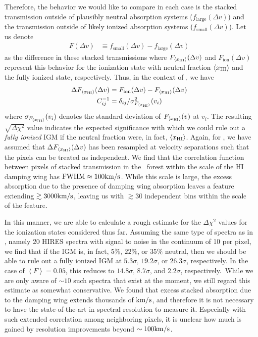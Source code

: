 Therefore, the behavior we would like to compare in each case is the stacked transmission outside of plausibly neutral absorption systems ($f_{\text{large}}(\Delta v)$) and the transmission outside of likely ionized absorption systems ($f_{\text{small}}(\Delta v)$). Let us denote 
\begin{align}
F(\Delta v) &\equiv f_{\text{small}}(\Delta v) - f_{\text{large}}(\Delta v)
 \end{align}
as the difference in these stacked transmissions where $F_{\langle x_{\text{HI}}\rangle}(\Delta v)$ and $F_{\text{ion}}(\Delta v)$ represent this behavior for the ionization state with neutral fraction $\langle x_{\text{HI}}\rangle$ and the fully ionized state, respectively. Thus, in the context of , we have
\begin{align}
\Delta F_{\langle x_{\text{HI}}\rangle}(\Delta v) &= F_{\text{ion}}(\Delta v) - F_{\langle x_{\text{HI}}\rangle}(\Delta v) \\
C^{-1}_{ij} &= \delta_{ij}/\sigma^2_{F_{\langle x_{\text{HI}}\rangle}}(v_i) \label{eq:ChiSquare_HI}
\end{align}
 where $\sigma_{F_{\langle x_{\text{HI}}\rangle}}(v_i)$ denotes the standard deviation of $F_{\langle x_{\text{HI}}\rangle}(v)$ at $v_i$. The resulting $\sqrt{\Delta \chi^2}$ value indicates the expected significance with which we could rule out a \textit{fully ionized} IGM if the neutral fraction were, in fact, $\langle x_{\text{HI}}\rangle$. Again, for , we have assumed that $\Delta F_{\langle x_{\text{HI}}\rangle}(\Delta v)$ has been resampled at velocity separations such that the pixels can be treated as independent. We find that the correlation function between pixels of stacked transmission in the \lya\ forest within the scale of the HI damping wing has $\text{FWHM}\approx 100\text{km}/\text{s}$. While this scale is large, the excess absorption due to the presence of damping wing absorption leaves a feature extending $\gtrsim 3000\text{km}/\text{s}$, leaving us with $\gtrsim 30$ independent bins within the scale of the feature.
 

In this manner, we are able to calculate a rough estimate for the $\Delta \chi^2$ values for the ionization states considered thus far.  Assuming the same type of spectra as in , namely 20 HIRES spectra with signal to noise in the continuum of 10 per pixel, we find that if the IGM is, in fact, $5\%$, $22\%$, or $35\%$ neutral, then we should be able to rule out a fully ionized IGM at $5.3\sigma$, $19.2\sigma$, or $26.3\sigma$, respectively. In the case of $\left\langle F \right\rangle = 0.05$, this reduces to $14.8\sigma$, $8.7\sigma$, and $2.2\sigma$, respectively.\footnotemark\  While we are only aware of $\sim 10$ such spectra that exist at the moment, we still regard this estimate as somewhat conservative. We found that excess stacked absorption due to the damping wing extends thousands of $\text{km}/\text{s}$, and therefore it is not necessary to have the state-of-the-art in spectral resolution to measure it. Especially with such extended correlation among neighboring pixels, it is unclear how much is gained by resolution improvements beyond $\sim 100\text{km}/\text{s}$.



